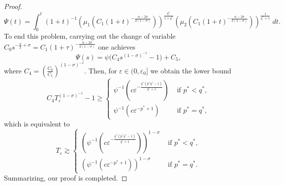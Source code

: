 \documentclass[11pt,reqno]{amsart}
\newcommand{\tron}[1]{\left( #1 \right)}
\numberwithin{equation}{section}
\theoremstyle{plain}
\begin{document}
\begin{proof}
\[
\Psi(t)=\int_{0}^{t}(1+t)^{-1}\tron{\mu_1\tron{C_1(1+t)^{-\frac{n-2\sigma}{2(1-\sigma)}}}}^{\frac{q^*}{1+q^*}}\tron{\mu_2\tron{C_1(1+t)^{-\frac{n-2\sigma}{2(1-\sigma)}}}}^{\frac{1}{q^*+1}}\;dt.
\]
To end this problem, carrying out the change of variable $C_0s^{-\frac{n}{2}+\sigma}=C_1(1+\tau)^{-\frac{n-2\sigma}{2(1-\sigma)}}$ one achieves
\[
\Psi(s)=\psi\big(C_4s^{(1-\sigma)^{-1}}-1\big)+C_5,
\]
where $C_4=\tron{\frac{C_0}{C_1}}^{(1-\sigma)^{-1}}$. Then, for $\varepsilon \in (0,\varepsilon_0]$ we obtain the lower bound
\[
C_4 T_{\varepsilon}^{(1-\sigma)^{-1}}-1\geq
\begin{cases}
    \psi^{-1}\tron{c\varepsilon^{-\frac{q^*(p^*q^*-1)}{q^*+1}}} &\text{ if $p^*<q^*$},\\
    \psi^{-1}\tron{c\varepsilon^{-p^*+1}} &\text{ if $p^*=q^*$},
\end{cases}
\]
which is equivalent to 
\[
T_{\varepsilon} \gtrsim \begin{cases}
    \tron{\psi^{-1}\tron{c\varepsilon^{-\frac{q^*(p^*q^*-1)}{q^*+1}}}}^{1-\sigma} &\text{ if $p^*<q^*$},\\
    \tron{\psi^{-1}\tron{c\varepsilon^{-p^*+1}}}^{1-\sigma} &\text{ if $p^*=q^*$}.
\end{cases}
\]
Summarizing, our proof is completed.
\end{proof}
\end{document}
